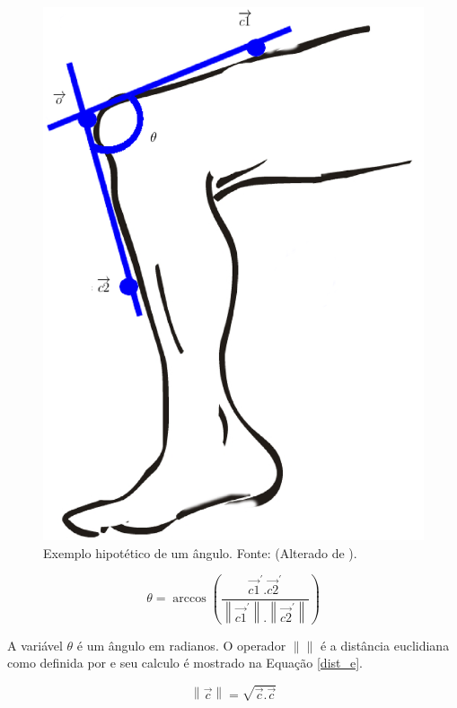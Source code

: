 \begin{figure}[H]
	\centering
	\includegraphics[width=14cm]{figuras/leg.eps}
	\caption{Exemplo hipotético de um ângulo. Fonte: (Alterado de ).}
	\label{leg}
\end{figure}


\begin{equation}
	\label{angulo}
	\theta = \arccos{(\frac{\overrightarrow{c1}^\prime.\overrightarrow{c2}^\prime} 
	{  \left \| \overrightarrow{c1}^\prime \right \|. \left \| \overrightarrow{c2}^\prime \right \|} )} 
\end{equation}

A variável $\theta$ é um ângulo em radianos.
O operador  $\left \| \right \|$ é a distância euclidiana como definida por  e seu calculo é mostrado na Equação \ref{dist_e}.

\begin{equation}
	\label{dist_e}
	  \left \| \overrightarrow{c} \right \|  =  \sqrt{\overrightarrow{c} . \overrightarrow{c}}
\end{equation}

